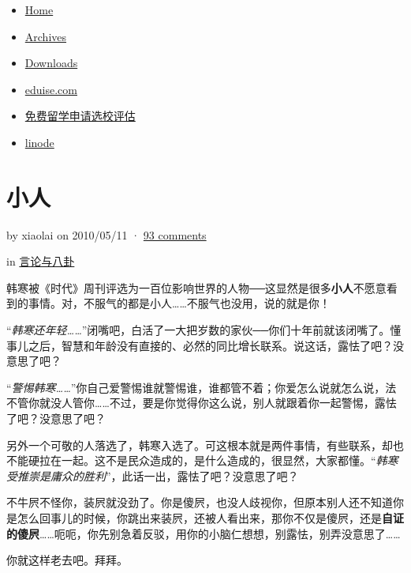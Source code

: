 \begin{itemize}[<+->]
\item
  \href{/web/20131011170823/http://www.lixiaolai.com/}{Home}
\item
  \href{/web/20131011170823/http://wordpress.lixiaolai.com/archives}{Archives}
\item
  \href{/web/20131011170823/http://wordpress.lixiaolai.com/downloads}{Downloads}
\item
  \href{/web/20131011170823/http://www.eduise.com/}{eduise.com}
\item
  \href{/web/20131011170823/http://www.eduise.com/client/evaluation}{免费留学申请选校评估}
\item
  \href{/web/20131011170823/http://www.lixiaolai.com/linode-vps}{linode}
\end{itemize}

\section{小人}

by xiaolai on 2010/05/11 ·
\href{/web/20131011170823/http://wordpress.lixiaolai.com/archives/9336.html\#comments}{93
comments}

in
\href{/web/20131011170823/http://wordpress.lixiaolai.com/archives/category/opinions}{言论与八卦}

韩寒被《时代》周刊评选为一百位影响世界的人物──这显然是很多\textbf{小人}不愿意看到的事情。对，不服气的都是小人\ldots{}\ldots{}不服气也没用，说的就是你！

``\emph{韩寒还年轻\ldots{}\ldots{}}''闭嘴吧，白活了一大把岁数的家伙──你们十年前就该闭嘴了。懂事儿之后，智慧和年龄没有直接的、必然的同比增长联系。说这话，露怯了吧？没意思了吧？

``\emph{警惕韩寒\ldots{}\ldots{}}''你自己爱警惕谁就警惕谁，谁都管不着；你爱怎么说就怎么说，法不管你就没人管你\ldots{}\ldots{}不过，要是你觉得你这么说，别人就跟着你一起警惕，露怯了吧？没意思了吧？

另外一个可敬的人落选了，韩寒入选了。可这根本就是两件事情，有些联系，却也不能硬拉在一起。这不是民众造成的，是什么造成的，很显然，大家都懂。``\emph{韩寒受推崇是庸众的胜利}''，此话一出，露怯了吧？没意思了吧？

不牛屄不怪你，装屄就没劲了。你是傻屄，也没人歧视你，但原本别人还不知道你是怎么回事儿的时候，你跳出来装屄，还被人看出来，那你不仅是傻屄，还是\textbf{自证的傻屄}\ldots{}\ldots{}呃呃，你先别急着反驳，用你的小脑仁想想，别露怯，别弄没意思了\ldots{}\ldots{}

你就这样老去吧。拜拜。

